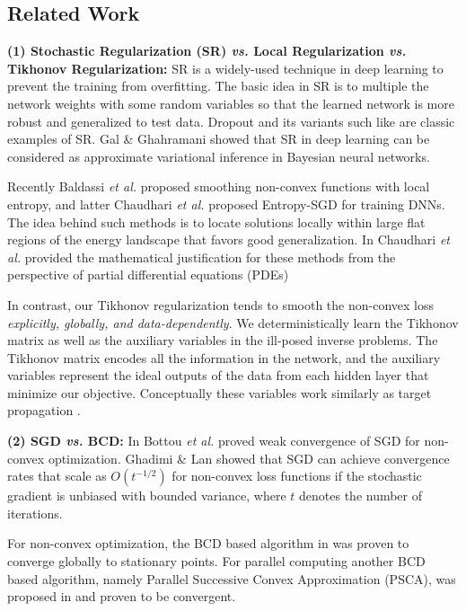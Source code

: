 \documentclass{article}
\def\vs{\emph{vs. }}
\def\etal{\emph{et al. }}
\begin{document}
	
	\subsection{Related Work}{\bf (1) Stochastic Regularization (SR) \vs Local Regularization \vs Tikhonov Regularization:} SR is a widely-used technique in deep learning to prevent the training from overfitting. The basic idea in SR is to multiple the network weights with some random variables so that the learned network is more robust and generalized to test data. Dropout \cite{srivastava2014dropout} and its variants such like \cite{kingma2015variational} are classic examples of SR. Gal \& Ghahramani \cite{gal2015modern} showed that SR in deep learning can be considered as approximate variational inference in Bayesian neural networks.%
	
	Recently Baldassi \etal \cite{baldassi2015subdominant} proposed smoothing non-convex functions with local entropy, and latter Chaudhari \etal \cite{chaudhari2016entropy} proposed Entropy-SGD for training DNNs. The idea behind such methods is to locate solutions locally within large flat regions of the energy landscape that favors good generalization. In \cite{chaudhari2017deep} Chaudhari \etal provided the mathematical justification for these methods from the perspective of partial differential equations (PDEs)
	
	In contrast, our Tikhonov regularization tends to smooth the non-convex loss {\em explicitly, globally, and data-dependently}. We deterministically learn the Tikhonov matrix as well as the auxiliary variables in the ill-posed inverse problems. The Tikhonov matrix encodes all the information in the network, and the auxiliary variables represent the ideal outputs of the data from each hidden layer that minimize our objective. Conceptually these variables work similarly as target propagation \cite{bengio2014auto}.
	
	
	{\bf (2) SGD \vs BCD:} 
	In \cite{bottou2016optimization} Bottou \etal proved weak convergence of SGD for non-convex optimization. Ghadimi \& Lan \cite{ghadimi2013stochastic} showed that SGD can achieve convergence rates that scale as $O\left(t^{-1/2}\right)$ for non-convex loss functions if the stochastic gradient is unbiased with bounded variance, where $t$ denotes the number of iterations.
	
	For non-convex optimization, the BCD based algorithm in \cite{xu2014globally} was proven to converge globally to stationary points. For parallel computing another BCD based algorithm, namely Parallel Successive Convex Approximation (PSCA), was proposed in \cite{razaviyayn2014parallel} and proven to be convergent.
	
\end{document}
